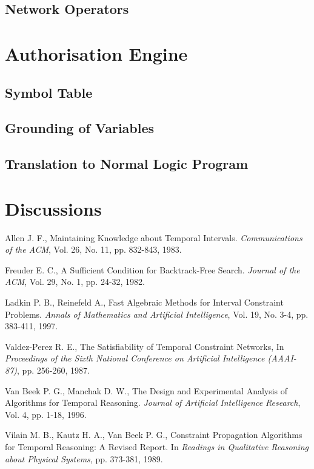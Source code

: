 \documentclass[11pt]{report}
\begin{document}
      \subsection{Network Operators}

    \section{Authorisation Engine}

      \subsection{Symbol Table}

      \subsection{Grounding of Variables}

      \subsection{Translation to Normal Logic Program}

    \section{Discussions} 

  \begin{thebibliography}{M}
      Allen J. F.,
      Maintaining Knowledge about Temporal Intervals.
      {\em Communications of the ACM},
      Vol. 26, No. 11, pp. 832-843,
      1983.

      Freuder E. C.,
      A Sufficient Condition for Backtrack-Free Search.
      {\em Journal of the ACM},
      Vol. 29, No. 1, pp. 24-32,
      1982.

      Ladkin P. B., Reinefeld A.,
      Fast Algebraic Methods for Interval Constraint Problems.
      {\em Annals of Mathematics and Artificial Intelligence},
      Vol. 19, No. 3-4, pp. 383-411,
      1997.

      Valdez-Perez R. E.,
      The Satisfiability of Temporal Constraint Networks,
      In {\em Proceedings of the Sixth National Conference on Artificial Intelligence (AAAI-87)},
      pp. 256-260,
      1987.

      Van Beek P. G., Manchak D. W.,
      The Design and Experimental Analysis of Algorithms for Temporal Reasoning.
      {\em Journal of Artificial Intelligence Research},
      Vol. 4, pp. 1-18,
      1996.

      Vilain M. B., Kautz H. A., Van Beek P. G.,
      Constraint Propagation Algorithms for Temporal Reasoning: A Revised Report.
      In {\em Readings in Qualitative Reasoning about Physical Systems},
      pp. 373-381,
      1989.
  \end{thebibliography}
\end{document}
